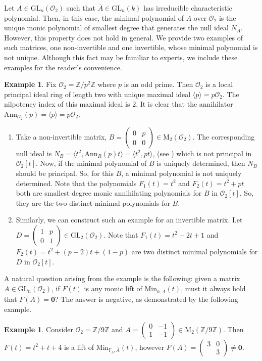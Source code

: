 \documentclass[11pt,twoside]{amsart}
\newcommand{\GL}{\mathrm{GL}}
\newcommand{\M}{\mathrm{M}}
\newcommand{\Z}{\mathbb{Z}}
\newcommand{\R}{\mathscr{O}_2}
\theoremstyle{definition} %
\newtheorem{example}[lemma]{Example}
\begin{document}
Let $A\in \GL_n(\R)$ such that $\overline{A} \in \GL_n(k)$ has irreducible characteristic polynomial. 
Then, in this case, the minimal polynomial of $A$ over $\R$ is the unique monic polynomial of smallest degree that generates the null ideal $N_A$. 
However, this property does not hold in general. 
We provide two examples of such matrices,  one non-invertible and one invertible, whose minimal polynomial is not unique. 
Although this fact may be familiar to experts, we include these examples for the reader's convenience.

\begin{example}
Fix $\R = \mathbb{Z}/p^2\mathbb{Z}$ where $p$ is an odd prime. 
Then $\R$ is a local principal ideal ring of length two with unique maximal ideal $\langle p\rangle = p\R$. 
The nilpotency index of this maximal ideal is $2$. 
It is clear that the annihilator $\mathrm{Ann}_{\R}(p)= \langle p\rangle=p\R$. 
\begin{enumerate}
\item Take a non-invertible matrix, $B= \begin{pmatrix} 0 & p \\ 0 & 0 \end{pmatrix}\in \M_2(\R)$.
The corresponding null ideal is $N_B=\langle  t^2, \mathrm{Ann}_R(p)t \rangle = \langle t^2,pt\rangle$, (see \cite[Lemma 2.1]{Brown2005}) which is not principal in $\R[t]$. Now, if the minimal polynomial of $B$ is uniquely determined, then $N_B$ should be principal. So, for this $B$, a minimal polynomial is not uniquely determined. Note that the polynomials $F_1(t) = t^2$ and $F_2(t) = t^2+pt$ both are smallest degree monic annihilating polynomials for $B$ in $\R[t]$. So, they are the two distinct minimal polynomials for $B$.
\item Similarly, we can construct such an example for an invertible matrix. Let $D= \begin{pmatrix}  1 & p \\ 0 & 1 \end{pmatrix}\in \GL_2(\R)$. Note that $F_1(t)=t^2-2t+1$ and $F_2(t)= t^2+(p-2)t+(1-p)$ are two distinct minimal polynomials for $D$ in $\R[t]$.       
\end{enumerate}
\end{example}
A natural question arising from the example is the following: given a matrix $A \in \GL_n(\R)$, if $F(t)$ is any monic lift of $\mathrm{Min}_{k,\overline{A}}(t)$, must it always hold that $F(A)=\mathbf 0$? 
The answer is negative, as demonstrated by the following example.
\begin{example}
    Consider $\R=\Z/9\Z$ and $A=\begin{pmatrix}
        0 & -1\\
        1 & -1
    \end{pmatrix}\in\M_2(\Z/9\Z)$.
    Then $F(t)=t^2+t+4$ is a lift of $\mathrm{Min}_{\mathbb F_3,\overline{A}}(t)$, however $F(A)=\begin{pmatrix}
        3 & 0\\&3
    \end{pmatrix}\neq \mathbf 0$.
\end{example}
\end{document}
